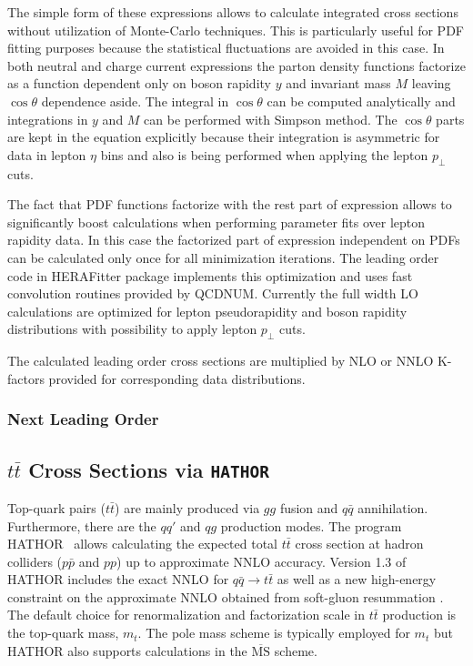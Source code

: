 \documentclass[11pt,a4paper]{article}
\begin{document}
The simple form of these expressions allows to calculate integrated
cross sections without utilization of Monte-Carlo techniques.
This is particularly useful for PDF fitting purposes because
the statistical fluctuations are avoided in this case. In both 
neutral and charge current expressions the parton density functions
factorize as a function dependent only on boson rapidity \(y\) and
invariant mass \(M\) leaving \(\cos\theta\) dependence aside.
The integral in \(\cos\theta\) can be computed analytically and
integrations in \(y\) and \(M\) can be performed with Simpson
method. The \(\cos\theta\) parts are kept in the equation 
explicitly because their integration is asymmetric for
data in lepton \(\eta\) bins and also is being performed when applying 
the lepton \(p_{\perp}\) cuts.

The fact that PDF functions factorize with the rest part of 
expression allows to significantly boost calculations when 
performing parameter fits over lepton rapidity data. In this case
the factorized part of expression independent on PDFs can be
calculated only once for all minimization iterations.
The leading order code in HERAFitter package implements this 
optimization and uses fast convolution routines provided by
QCDNUM. Currently the full width LO calculations are optimized 
for lepton pseudorapidity and boson rapidity distributions with
possibility to apply lepton \(p_{\perp}\) cuts.

The calculated leading order cross sections are multiplied by
NLO or NNLO K-factors provided for corresponding data distributions.
\subsubsection{Next Leading Order}
\subsection{$t\bar{t}$ Cross Sections via {\tt HATHOR}}
Top-quark pairs ($t\bar{t}$) are mainly produced via $gg$ fusion and
$q \bar q$ annihilation. Furthermore, there are the $q q'$ and
$q g$ production modes.
The program HATHOR~\cite{Aliev:2010zk} allows calculating
the expected total $t \bar t$ cross section at hadron colliders
($p \bar p$ and $p p$) up to approximate NNLO accuracy.
Version 1.3 of HATHOR includes the exact NNLO for $q \bar q \to t \bar t$ \cite{Baernreuther:2012ws}
as well as a new high-energy constraint on the approximate NNLO obtained from
soft-gluon resummation \cite{Moch:2012mk}.
The default choice for renormalization and factorization scale in $t \bar t$ production is the top-quark mass, $m_t$.
The pole mass scheme is typically employed for $m_t$ but HATHOR also supports calculations in
the $\overline{\text{MS}}$ scheme.
\end{document}
